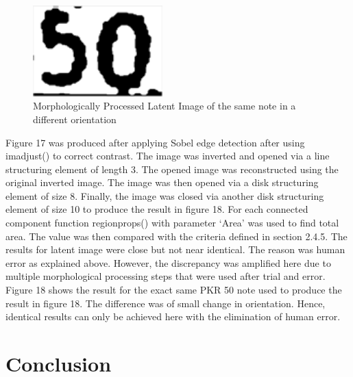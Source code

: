\documentclass{article}
\begin{document}
\begin{figure}[h!]

\begin{minipage}[b]{1.0\linewidth}
  \centering
  \centerline{\includegraphics[width=5cm]{l3.png}}
  \vspace{-3mm}
\end{minipage}
%
\caption{Morphologically Processed Latent Image of the same note in a different orientation}
\label{fig:l3}
\vspace{-3mm}
\end{figure}
\newpage
Figure 17 was produced after applying Sobel edge detection after using imadjust() to correct contrast. The image was inverted and opened via a line structuring element of length 3. The opened image was reconstructed using the original inverted image. The image was then opened via a disk structuring element of size 8. Finally, the image was closed via another disk structuring element of size 10 to produce the result in figure 18. For each connected component function regionprops() with parameter ‘Area’ was used to find total area. The value was then compared with the criteria defined in section 2.4.5. The results for latent image were close but not near identical. The reason was human error as explained above. However, the discrepancy was amplified here due to multiple morphological processing steps that were used after trial and error. Figure 18 shows the result for the exact same PKR 50 note used to produce the result in figure 18. The difference was of small change in orientation. Hence, identical results can only be achieved here with the elimination of human error. 

\vspace{-1mm}
\section{Conclusion}
\label{sec:conclusion}
\vspace{-1mm}
\end{document}
